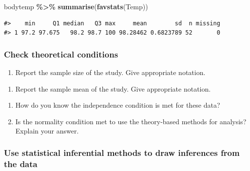 \documentclass[
]{report}
\newenvironment{Shaded}{\begin{snugshade}}{\end{snugshade}}
\newcommand{\FunctionTok}[1]{\textcolor[rgb]{0.13,0.29,0.53}{\textbf{#1}}}
\newcommand{\NormalTok}[1]{#1}
\newcommand{\SpecialCharTok}[1]{\textcolor[rgb]{0.81,0.36,0.00}{\textbf{#1}}}
\providecommand{\tightlist}{%
  \setlength{\itemsep}{0pt}\setlength{\parskip}{0pt}}
\begin{document}
\begin{Shaded}
\begin{Highlighting}[]
\NormalTok{bodytemp }\SpecialCharTok{\%\textgreater{}\%} 
  \FunctionTok{summarise}\NormalTok{(}\FunctionTok{favstats}\NormalTok{(Temp))}
\end{Highlighting}
\end{Shaded}

\begin{verbatim}
#>    min     Q1 median   Q3 max     mean        sd  n missing
#> 1 97.2 97.675   98.2 98.7 100 98.28462 0.6823789 52       0
\end{verbatim}

\subsubsection*{Check theoretical conditions}\label{check-theoretical-conditions}

\begin{enumerate}
\def\labelenumi{\arabic{enumi}.}
\setcounter{enumi}{2}
\tightlist
\item
  Report the sample size of the study. Give appropriate notation.
\end{enumerate}

\vspace{0.3in}

\begin{enumerate}
\def\labelenumi{\arabic{enumi}.}
\setcounter{enumi}{3}
\tightlist
\item
  Report the sample mean of the study. Give appropriate notation.
\end{enumerate}

\vspace{0.3in}

\begin{enumerate}
\def\labelenumi{\arabic{enumi}.}
\setcounter{enumi}{4}
\item
  How do you know the independence condition is met for these data?
  \vspace{0.8in}
\item
  Is the normality condition met to use the theory-based methods for analysis? Explain your answer.
  \vspace{1in}
\end{enumerate}

\newpage

\subsubsection*{Use statistical inferential methods to draw inferences from the data}\label{use-statistical-inferential-methods-to-draw-inferences-from-the-data}
\end{document}
